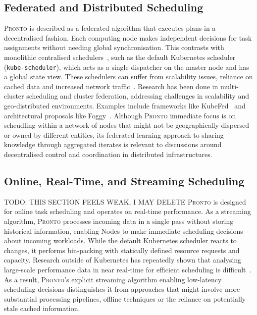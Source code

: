 \subsection{Federated and Distributed Scheduling}
\textsc{Pronto} is described as a federated algorithm that executes plans in a
decentralised fashion. Each computing node makes independent decisions for task
assignments without needing global synchronisation. This contrasts with
monolithic centralised schedulers~\cite{kube-scheduler, gog_firmament_2016},
such as the default Kubernetes scheduler (\texttt{kube-scheduler}), which acts
as a single dispatcher on the master node and has a global state view. These
schedulers can suffer from scalability issues, reliance on cached data and
increased network traffic~\cite{grammenos_pronto_2021}. Research has been done
in multi-cluster scheduling and cluster federation, addressing challenges in
scalability and geo-distributed environments. Examples include frameworks like
KubeFed~\cite{faticanti2021application} and architectural proposals like
Foggy~\cite{santoro2017foggy}. Although \textsc{Pronto} immediate focus is on
scheudling within a network of nodes that might not be geographically dispersed
or owned by different entities, its federated learning approach to sharing
knowledge through aggregated iterates is relevant to discussions around
decentralised control and coordination in distributed infrastructures.

\subsection{Online, Real-Time, and Streaming Scheduling}
TODO: THIS SECTION FEELS WEAK, I MAY DELETE
\textsc{Pronto} is designed for online task scheduling and operates on real-time
performance. As a streaming algorithm, \textsc{Pronto} processes incoming data
in a single pass without storing historical information, enabling Nodes to make
immediate scheduling decisions about incoming workloads. While the default
Kubernetes scheduler reacts to changes, it performs bin-packing with statically
defined resource requests and capacity. Research outside of Kubernetes has
repeatedly shown that analysing large-scale performance data in near real-time
for efficient scheduling is difficult~\cite{grammenos_pronto_2021}. As a result,
\textsc{Pronto}'s explicit streaming algorithm enabling low-latency scheduling
decisions distinguishes it from approaches that might involve more substantial
processing pipelines, offline techniques or the reliance on potentially stale
cached information.

